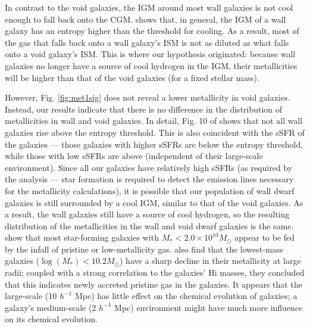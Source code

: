 In contrast to the void galaxies, the IGM around most wall galaxies is not cool 
enough to fall back onto the CGM.  \cite{Cen11} shows that, in general, the IGM 
of a wall galaxy has an entropy higher than the threshold for cooling.  As a 
result, most of the gas that falls back onto a wall galaxy's ISM is not as 
diluted as what falls onto a void galaxy's ISM.  This is where our hypothesis 
originated: because wall galaxies no longer have a source of cool hydrogen in 
the IGM, their metallicities will be higher than that of the void galaxies (for 
a fixed stellar mass).

However, Fig. \ref{fig:met1sig} does not reveal a lower metallicity in void 
galaxies.  Instead, our results indicate that there is no difference in the 
distribution of metallicities in wall and void galaxies.  In detail, Fig. 10 of 
\cite{Cen11} shows that not all wall galaxies rise above the entropy threshold.  
This is also coincident with the sSFR of the galaxies --- those galaxies with 
higher sSFRs are below the entropy threshold, while those with low sSFRs are 
above (independent of their large-scale environment).  Since all our galaxies 
have relatively high sSFRs (as required by the analysis --- star formation is 
required to detect the emission lines necessary for the metallicity 
calculations), it is possible that our population of wall dwarf galaxies is 
still surrounded by a cool IGM, similar to that of the void galaxies.  As a 
result, the wall galaxies still have a source of cool hydrogen, so the resulting 
distribution of the metallicities in the wall and void dwarf galaxies is the 
same.  \cite{Brisbin12} show that most star-forming galaxies with 
$M_* < 2.0\times 10^{10} M_{\odot}$ appear to be fed by the infall of pristine 
or low-metallicity gas.  \cite{Moran12} also find that the lowest-mass galaxies 
($\log(M_*) < 10.2 M_{\odot}$) have a sharp decline in their metallicity at 
large radii; coupled with a strong correlation to the galaxies' H{\sc i} masses, 
they concluded that this indicates newly accreted pristine gas in the galaxies.  
It appears that the large-scale (10 $h^{-1}$ Mpc) has little effect on the 
chemical evolution of galaxies; a galaxy's medium-scale (2 $h^{-1}$ Mpc) 
environment might have much more influence on its chemical evolution.

